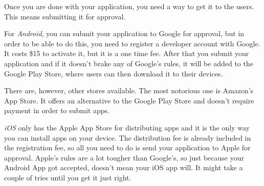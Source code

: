 Once you are done with your application, you need a way to get it to the users. This means submitting it for approval.

For \textit{Android}, you can submit your application to Google for approval, but in order to be able to do this, you need to register a developer account with Google. It costs \$15 to activate it, but it is a one time fee. After that you submit your application and if it doesn't brake any of Google's rules, it will be added to the Google Play Store, where users can then download it to their devices. 

There are, however, other stores available. The most notorious one is Amazon's App Store. It offers an alternative to the Google Play Store and doesn't require payment in order to submit apps.

\textit{iOS} only has the Apple App Store for distributing apps and it is the only way you can install apps on your device. The distribution fee is already included in the registration fee, so all you need to do is send your application to Apple for approval. Apple's rules are a lot tougher than Google's, so just because your Android App got accepted, doesn't mean your iOS app will. It might take a couple of tries until you get it just right.



 

 

 